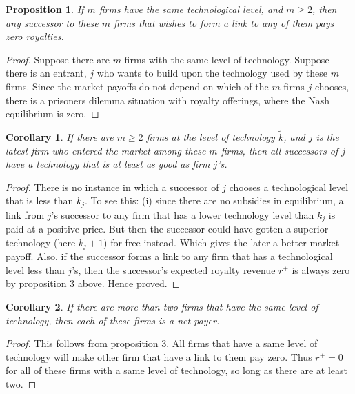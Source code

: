 \documentclass{article}
\newtheorem{corollary}{Corollary}
\newtheorem{proposition}{Proposition}
\begin{document}
\begin{proposition}\label{prop:twoiszero}
If $m$ firms have the same technological level, and $m\geq 2$, then any successor to these $m$ firms that wishes to form a link to any of them pays zero royalties. 
\end{proposition}

\begin{proof}
Suppose there are $m$ firms with the same level of technology. Suppose there is an entrant, $j$ who wants to build upon the technology used by these $m$ firms. Since the market payoffs do not depend on which of the $m$ firms $j$ chooses, there is a prisoners dilemma situation with royalty offerings, where the Nash equilibrium is zero. 
\end{proof}

\begin{corollary}\label{cor:atleast}
If there are $m\geq 2$ firms at the level of technology $\tilde{k}$, and $j$ is the latest firm who entered the market among these $m$ firms, then all successors of $j$ have a technology that is at least as good as firm $j$'s. 
\end{corollary}
\begin{proof}
There is no instance in which a successor of $j$ chooses a technological level that is less than $k_j$. To see this: (i) since there are no subsidies in equilibrium, a link from $j$'s successor to any firm that has a lower technology level than $k_j$ is paid at a positive price. But then the successor could have gotten a superior technology (here $k_j+1$) for free instead. Which gives the later a better market payoff. Also, if the successor forms a link to any firm that has a technological level less than $j$'s, then the successor's expected royalty revenue $r^+$ is always zero by proposition 3 above. Hence proved. 
\end{proof}

\begin{corollary}
If there are more than two firms that have the same level of technology, then each of these firms is a \textit{net payer}. 
\end{corollary}
\begin{proof}
This follows from proposition 3. All firms that have a same level of technology will make other firm that have a link to them pay zero. Thus $r^+=0$ for all of these firms with a same level of technology, so long as there are at least two. 
\end{proof}
\end{document}
